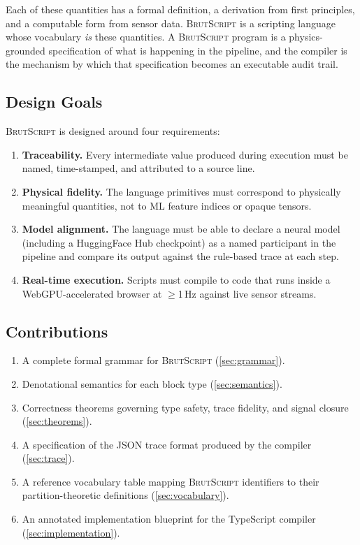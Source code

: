 \documentclass[10pt,twocolumn,a4paper]{article}
\theoremstyle{definition}
\theoremstyle{remark}
\newcommand{\BS}{\textsc{BrutScript}}
\begin{document}
Each of these quantities has a formal definition, a derivation from first
principles, and a computable form from sensor data.  \BS{} is a scripting
language whose vocabulary \emph{is} these quantities.  A \BS{} program
is a physics-grounded specification of what is happening in the pipeline,
and the compiler is the mechanism by which that specification becomes an
executable audit trail.

\subsection{Design Goals}

\BS{} is designed around four requirements:

\begin{enumerate}[leftmargin=*,nosep]
\item \textbf{Traceability.} Every intermediate value produced during
  execution must be named, time-stamped, and attributed to a source line.
\item \textbf{Physical fidelity.} The language primitives must correspond
  to physically meaningful quantities, not to ML feature indices or
  opaque tensors.
\item \textbf{Model alignment.} The language must be able to declare a
  neural model (including a HuggingFace Hub checkpoint) as a named
  participant in the pipeline and compare its output against the
  rule-based trace at each step.
\item \textbf{Real-time execution.} Scripts must compile to code that
  runs inside a WebGPU-accelerated browser at $\geq$1\,Hz against live
  sensor streams.
\end{enumerate}

\subsection{Contributions}

\begin{enumerate}[leftmargin=*,nosep]
\item A complete formal grammar for \BS{} (\cref{sec:grammar}).
\item Denotational semantics for each block type (\cref{sec:semantics}).
\item Correctness theorems governing type safety, trace fidelity, and
  signal closure (\cref{sec:theorems}).
\item A specification of the JSON trace format produced by the compiler
  (\cref{sec:trace}).
\item A reference vocabulary table mapping \BS{} identifiers to
  their partition-theoretic definitions (\cref{sec:vocabulary}).
\item An annotated implementation blueprint for the TypeScript
  compiler (\cref{sec:implementation}).
\end{enumerate}
\end{document}
